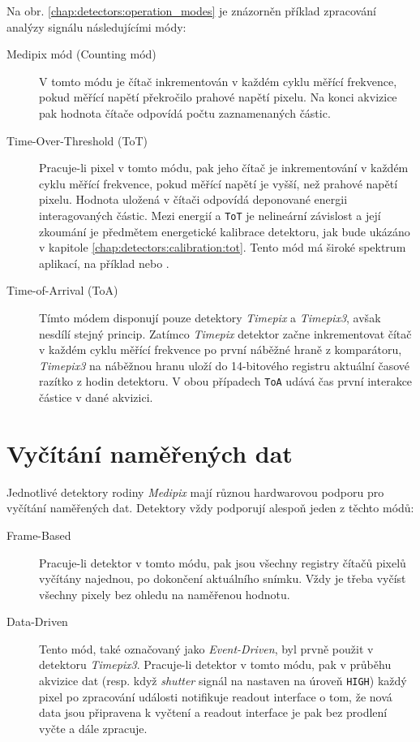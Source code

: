 Na obr. \ref{chap:detectors:operation_modes} je znázorněn příklad zpracování analýzy signálu následujícími módy:
\begin{description}
    \item[Medipix mód (Counting mód)] V tomto módu je čítač inkrementován v každém cyklu měřící frekvence, pokud měřící napětí překročilo prahové napětí pixelu. Na konci akvizice pak hodnota čítače odpovídá počtu zaznamenaných částic.
    \item[Time-Over-Threshold (ToT)] Pracuje-li pixel v tomto módu, pak jeho čítač je inkrementování v každém cyklu měřící frekvence, pokud měřící napětí je vyšší, než prahové napětí pixelu. Hodnota uložená v čítači odpovídá deponované energii interagovaných částic. Mezi energií a \texttt{ToT} je nelineární závislost a její zkoumání je předmětem energetické kalibrace detektoru, jak bude ukázáno v kapitole \ref{chap:detectors:calibration:tot}. Tento mód má široké spektrum aplikací, na příklad \cite{tot_app_counting} nebo \cite{tpx_app_radiotherapy}.
    \item[Time-of-Arrival (ToA)] Tímto módem disponují pouze detektory \textit{Timepix} a \textit{Timepix3}, avšak nesdílí stejný princip. Zatímco \textit{Timepix} detektor začne inkrementovat čítač v každém cyklu měřící frekvence po první náběžné hraně z komparátoru, \textit{Timepix3} na náběžnou hranu uloží do 14-bitového registru aktuální časové razítko z hodin detektoru. V obou případech \texttt{ToA} udává čas první interakce částice v dané akvizici.
\end{description}

\section{Vyčítání naměřených dat}\label{chap:detectors:readout}
Jednotlivé detektory rodiny \textit{Medipix} mají různou hardwarovou podporu pro vyčítání naměřených dat. Detektory vždy podporují alespoň jeden z těchto módů:
\begin{description}
	\item[Frame-Based] Pracuje-li detektor v tomto módu, pak jsou všechny registry čítačů pixelů vyčítány najednou, po dokončení aktuálního snímku. Vždy je třeba vyčíst všechny pixely bez ohledu na naměřenou hodnotu.
	\item[Data-Driven] Tento mód, také označovaný jako \textit{Event-Driven}, byl prvně použit v detektoru \textit{Timepix3}. Pracuje-li detektor v tomto módu, pak v průběhu akvizice dat (resp. když \textit{shutter} signál na nastaven na úroveň \texttt{HIGH}) každý pixel po zpracování události notifikuje readout interface o tom, že nová data jsou připravena k vyčtení a readout interface je pak bez prodlení vyčte a dále zpracuje.
\end{description}

